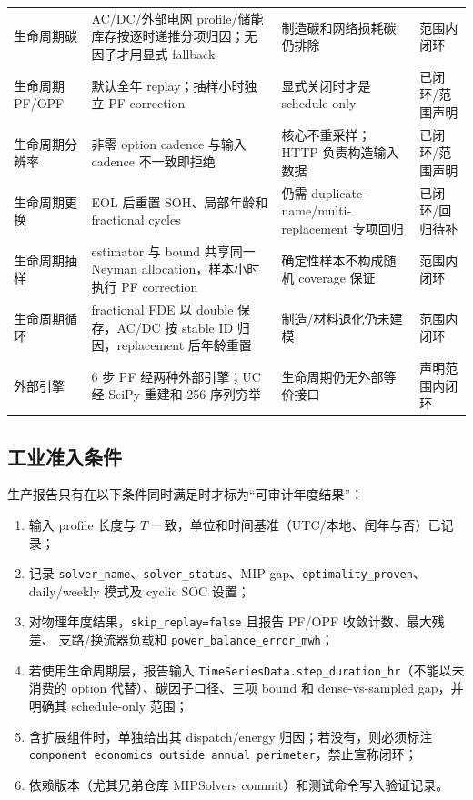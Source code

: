 \begin{longtable}{@{}L{3.6cm}L{3.1cm}L{4.3cm}L{2.1cm}@{}}
生命周期碳 & AC/DC/外部电网 profile/储能库存按逐时递推分项归因；无因子才用显式 fallback & 制造碳和网络损耗碳仍排除 & 范围内闭环\\
生命周期 PF/OPF & 默认全年 replay；抽样小时独立 PF correction & 显式关闭时才是 schedule-only & 已闭环/范围声明\\
生命周期分辨率 & 非零 option cadence 与输入 cadence 不一致即拒绝 & 核心不重采样；HTTP 负责构造输入数据 & 已闭环/范围声明\\
生命周期更换 & EOL 后重置 SOH、局部年龄和 fractional cycles & 仍需 duplicate-name/multi-replacement 专项回归 & 已闭环/回归待补\\
生命周期抽样 & estimator 与 bound 共享同一 Neyman allocation，样本小时执行 PF correction & 确定性样本不构成随机 coverage 保证 & 范围内闭环\\
生命周期循环 & fractional FDE 以 double 保存，AC/DC 按 stable ID 归因，replacement 后年龄重置 & 制造/材料退化仍未建模 & 范围内闭环\\
外部引擎 & 6 步 PF 经两种外部引擎；UC 经 SciPy 重建和 256 序列穷举 & 生命周期仍无外部等价接口 & 声明范围内闭环\\
\bottomrule
\end{longtable}

\subsection{工业准入条件}
生产报告只有在以下条件同时满足时才标为“可审计年度结果”：
\begin{enumerate}
  \item 输入 profile 长度与 $T$ 一致，单位和时间基准（UTC/本地、闰年与否）已记录；
  \item 记录 \texttt{solver\_name}、\texttt{solver\_status}、MIP gap、\texttt{optimality\_proven}、
        daily/weekly 模式及 cyclic SOC 设置；
  \item 对物理年度结果，\texttt{skip\_replay=false} 且报告 PF/OPF 收敛计数、最大残差、
        支路/换流器负载和 \texttt{power\_balance\_error\_mwh}；
  \item 若使用生命周期层，报告输入 \texttt{TimeSeriesData.step\_duration\_hr}（不能以未消费的
        option 代替）、碳因子口径、三项 bound 和 dense-vs-sampled gap，并明确其 schedule-only 范围；
  \item 含扩展组件时，单独给出其 dispatch/energy 归因；若没有，则必须标注
        \texttt{component economics outside annual perimeter}，禁止宣称闭环；
  \item 依赖版本（尤其兄弟仓库 MIPSolvers commit）和测试命令写入验证记录。
\end{enumerate}

